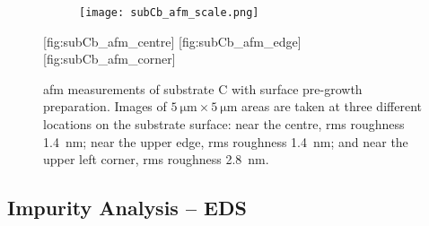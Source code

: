 
\begin{figure}[htbp]
    \centering
    \begin{subfigure}[c]{0.032\linewidth}
        \label{fig:subCb_afm_scale}\captionsetup{list=no}
        \texttt{[image: subCb\_afm\_scale.png]}
    \end{subfigure}
    \hfill
    [fig:subCb_afm_centre]  %
    \hfill
    [fig:subCb_afm_edge]  %
    \hfill
    [fig:subCb_afm_corner]  %
    \caption[\Ac{afm} of substrate C with surface pre-growth preparation.]{\Ac{afm} measurements of substrate C with surface pre-growth preparation. Images of $\SI{5}{\micro\metre}\times\SI{5}{\micro\metre}$ areas are taken at three different locations on the substrate surface:  near the centre, \ac{rms} roughness \SI{1.4}{\nano\metre};  near the upper edge, \ac{rms} roughness \SI{1.4}{\nano\metre}; and  near the upper left corner, \ac{rms} roughness \SI{2.8}{\nano\metre}.}
    \label{fig:subCb_afm}
\end{figure} %

\subsection{Impurity Analysis -- EDS}


